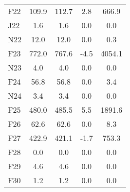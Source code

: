 \documentclass[article,crop=false]{standalone}%
\begin{document}
\begin{tabular}[h]{l | c c c c}
\rowcolor{white}%
F22&109.9&112.7&2.8&666.9\\%
\rowcolor{lightgray}%
J22&1.6&1.6&0.0&0.0\\%
\rowcolor{white}%
N22&12.0&12.0&0.0&0.3\\%
\rowcolor{lightgray}%
F23&772.0&767.6&{-}4.5&4054.1\\%
\rowcolor{white}%
N23&4.0&4.0&0.0&0.0\\%
\rowcolor{lightgray}%
F24&56.8&56.8&0.0&3.4\\%
\rowcolor{white}%
N24&3.4&3.4&0.0&0.0\\%
\rowcolor{lightgray}%
F25&480.0&485.5&5.5&1891.6\\%
\rowcolor{white}%
F26&62.6&62.6&0.0&8.3\\%
\rowcolor{lightgray}%
F27&422.9&421.1&{-}1.7&753.3\\%
\rowcolor{white}%
F28&0.0&0.0&0.0&0.0\\%
\rowcolor{lightgray}%
F29&4.6&4.6&0.0&0.0\\%
\rowcolor{white}%
F30&1.2&1.2&0.0&0.0\\%
\hline%
\end{tabular}%
\end{document}
